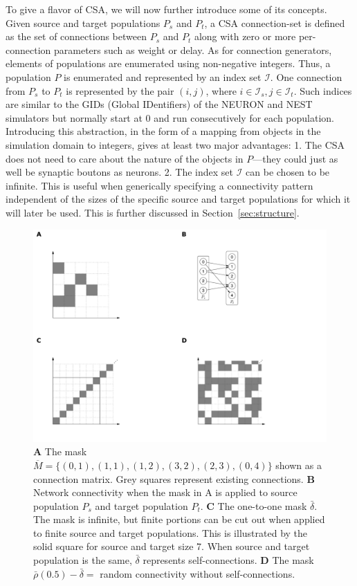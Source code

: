 \documentclass{frontiersSCNS} %
\newcommand{\INLINEFIGS}{} %
\begin{document}
To give a flavor of CSA, we will now further introduce some of its
concepts.  Given source and target populations $P_s$ and $P_t$, a CSA
connection-set is defined as the set of connections between $P_s$ and
$P_t$ along with zero or more per-connection parameters such as weight
or delay. As for connection generators, elements of populations are
enumerated using non-negative integers. Thus, a population $P$ is
enumerated and represented by an index set $\mathcal{I}$. One
connection from $P_s$ to $P_t$ is represented by the pair $(i, j)$,
where $i \in \mathcal{I}_s, j \in \mathcal{I}_t$.  Such indices are
similar to the GIDs (Global IDentifiers) of the NEURON and NEST
simulators but normally start at 0 and run consecutively for each
population.  Introducing this abstraction, in the form of a mapping
from objects in the simulation domain to integers, gives at least two
major advantages: 1. The CSA does not need to care about the nature of
the objects in $P$---they could just as well be synaptic boutons as
neurons.  2. The index set $\mathcal{I}$ can be chosen to be
infinite. This is useful when generically specifying a connectivity
pattern independent of the sizes of the specific source and target
populations for which it will later be used. This is further discussed
in Section~\ref{sec:structure}.

\ifdefined\INLINEFIGS
\begin{figure}[ht]
\centering
\includegraphics[scale=.7]{figures/csa-pane.pdf}
\caption{
  \textbf{A} The mask $\overline{M} =
  \{(0,1), (1,1), (1,2), (3,2), (2,3), (0,4)\}$ shown as a connection
  matrix. Grey squares represent existing connections.
  \textbf{B} Network connectivity when the mask in A is applied to
  source population $P_s$ and target population
  $P_t$.
  \textbf{C} The one-to-one mask $\bar{\delta}$. The mask is infinite,
  but finite portions can be cut out when applied to finite source and
  target populations. This is illustrated by the solid square for
  source and target size 7. When source and target population is the
  same, $\bar{\delta}$ represents self-connections.
  \textbf{D} The mask $\bar{\rho}(0.5) - \bar{\delta} =$ random
  connectivity without self-connections.
}\label{fig:csa} 
\end{figure}
\fi
\end{document}
